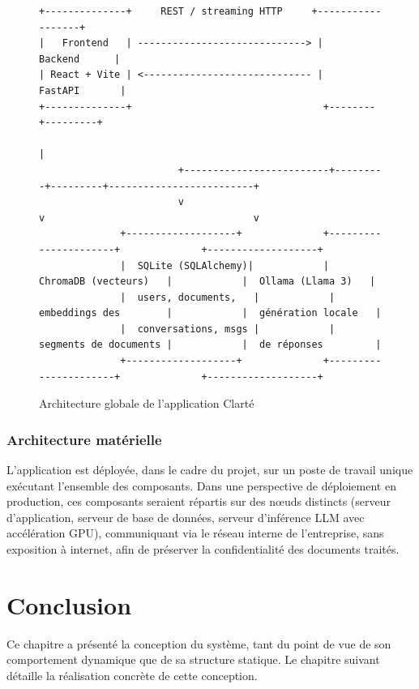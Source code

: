\documentclass[12pt,a4paper]{report}
\begin{document}
\begin{figure}[h]
\centering
\begin{verbatim}
+--------------+     REST / streaming HTTP     +------------------+
|   Frontend   | -----------------------------> |     Backend      |
| React + Vite | <----------------------------- |    FastAPI       |
+--------------+                                 +--------+---------+
                                                            |
                        +-------------------------+---------+---------+-------------------------+
                        v                                    v                                    v
              +-------------------+              +----------------------+              +-------------------+
              |  SQLite (SQLAlchemy)|            |  ChromaDB (vecteurs)   |            |  Ollama (Llama 3)   |
              |  users, documents,   |            |  embeddings des        |            |  génération locale   |
              |  conversations, msgs |            |  segments de documents |            |  de réponses         |
              +-------------------+              +----------------------+              +-------------------+
\end{verbatim}
\caption{Architecture globale de l'application Clarté}
\end{figure}

\subsubsection{Architecture matérielle}
L'application est déployée, dans le cadre du projet, sur un poste de travail unique exécutant l'ensemble des composants. Dans une perspective de déploiement en production, ces composants seraient répartis sur des nœuds distincts (serveur d'application, serveur de base de données, serveur d'inférence LLM avec accélération GPU), communiquant via le réseau interne de l'entreprise, sans exposition à internet, afin de préserver la confidentialité des documents traités.

\section{Conclusion}
Ce chapitre a présenté la conception du système, tant du point de vue de son comportement dynamique que de sa structure statique. Le chapitre suivant détaille la réalisation concrète de cette conception.

\end{document}
